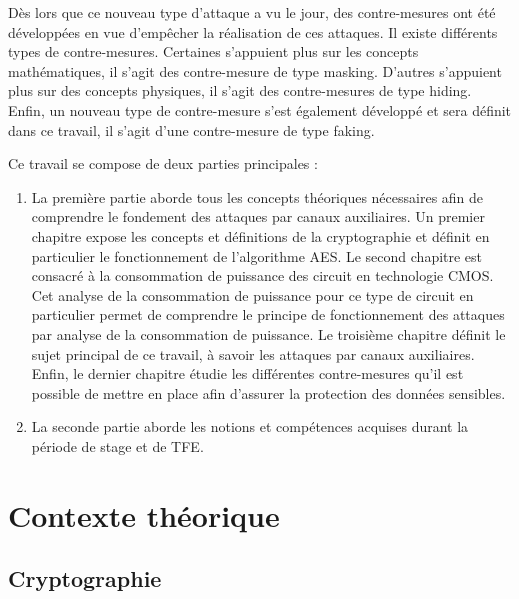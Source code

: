 \documentclass[oneside]{book}
\begin{document}
Dès lors que ce nouveau type d'attaque a vu le jour, des contre-mesures ont été développées en vue d'empêcher la réalisation de ces attaques. Il existe différents types de contre-mesures. Certaines s'appuient plus sur les concepts mathématiques, il s'agit des contre-mesure de type masking. D'autres s'appuient plus sur des concepts physiques, il s'agit des contre-mesures de type hiding. Enfin, un nouveau type de contre-mesure s'est également développé et sera définit dans ce travail, il s'agit d'une contre-mesure de type faking. 


\hspace{-0.5cm}Ce travail se compose de deux parties principales : 
\begin{enumerate}
\item La première partie aborde tous les concepts théoriques nécessaires afin de comprendre le fondement des attaques par canaux auxiliaires. Un premier chapitre expose les concepts et définitions de la cryptographie et définit en particulier le fonctionnement de l'algorithme AES. Le second chapitre est consacré à la consommation de puissance des circuit en technologie CMOS. Cet analyse de la consommation de puissance pour ce type de circuit en particulier permet de comprendre le principe de fonctionnement des attaques par analyse de la consommation de puissance. Le troisième chapitre définit le sujet principal de ce travail, à savoir les attaques par canaux auxiliaires. Enfin, le dernier chapitre étudie les différentes contre-mesures qu'il est possible de mettre en place afin d'assurer la protection des données sensibles. 
\item La seconde partie aborde les notions et compétences acquises durant la période de stage et de TFE. 
\end{enumerate}


\newpage


\part{Contexte théorique}


\chapter{Cryptographie}
\end{document}
